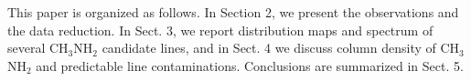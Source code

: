 This paper is organized as follows. 
In Section 2, we present the observations and the data reduction.
In Sect. 3, we report distribution maps and spectrum  of several CH$_3$NH$_2$ candidate lines, 
and in Sect. 4 we discuss column density of CH$_3$NH$_2$ and predictable line contaminations.
Conclusions are summarized in Sect. 5.

